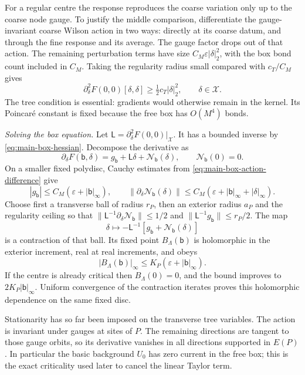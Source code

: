 \documentclass[11pt,letterpaper,reqno]{amsart}
\theoremstyle{definition}
\theoremstyle{remark}
\begin{document}
For a regular centre the response reproduces the
coarse variation only up to the coarse node gauge.
To justify the middle comparison, differentiate
the gauge-invariant coarse Wilson action in two
ways: directly at its coarse datum, and through
the fine response and its average. The gauge
factor drops out of that action. The remaining
perturbation terms have size
\(C_M\varepsilon|\delta|_2^2\), with the box bond
count included in \(C_M\). Taking the regularity
radius small compared with \(c_T/C_M\) gives
\begin{equation}\label{eq:main-box-hessian}
 \partial_\delta^2F(0,0)[\delta,\delta]
                         \ge\tfrac12c_T|\delta|_2^2,
                    \qquad\delta\in\mathcal X .
\end{equation}
The tree condition is essential: gradients would
otherwise remain in the kernel. Its Poincar\'e
constant is fixed because the free box has
\(O(M^4)\) bonds.

\emph{Solving the box equation.}
Let \(\mathsf L=\partial_\delta^2F(0,0)|_{\mathcal X}\).
It has a bounded inverse by
\eqref{eq:main-box-hessian}. Decompose the derivative as
\[
 \partial_\delta F(\mathsf b,\delta)
       =g_{\mathsf b}+\mathsf L\delta
                                   +\mathcal N_{\mathsf b}(\delta),
 \qquad \mathcal N_{\mathsf b}(0)=0.
\]
On a smaller fixed polydisc, Cauchy estimates from
\eqref{eq:main-box-action-difference} give
\[
 |g_{\mathsf b}|\le C_M(\varepsilon+|\mathsf b|_\infty),
 \qquad
 \|\partial_\delta\mathcal N_{\mathsf b}(\delta)\|
       \le C_M(\varepsilon+|\mathsf b|_\infty+|\delta|_\infty).
\]
Choose first a transverse ball of radius \(r_P\),
then an exterior radius \(a_P\) and the regularity
ceiling so that
\(\|\mathsf L^{-1}\partial_\delta\mathcal N_{\mathsf b}\|
\le1/2\) and
\(\|\mathsf L^{-1}g_{\mathsf b}\|\le r_P/2\).
The map
\[
 \delta\longmapsto-\mathsf L^{-1}
                 [g_{\mathsf b}+\mathcal N_{\mathsf b}(\delta)]
\]
is a contraction of that ball. Its fixed point
\(B_\Lambda(\mathsf b)\) is holomorphic in the
exterior increment, real at real increments,
and obeys
\[
 |B_\Lambda(\mathsf b)|_\infty
                    \le K_P(\varepsilon+|\mathsf b|_\infty).
\]
If the centre is already critical then
\(B_\Lambda(0)=0\), and the bound improves to
\(2K_P|\mathsf b|_\infty\). Uniform convergence of
the contraction iterates proves this holomorphic
dependence on the same fixed disc.

Stationarity has so far been imposed on the
transverse tree variables. The action is invariant
under gauges at sites of \(P\). The remaining
directions are tangent to those gauge orbits,
so its derivative vanishes in all directions
supported in \(E(P)\). In particular the basic
background \(U_0\) has zero current in the free
box; this is the exact criticality used later
to cancel the linear Taylor term.
\end{document}
